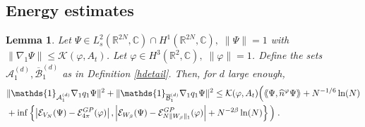 \documentclass[11pt, english, american]{article}
\newcommand{\laa}{\langle\hspace{-0.08cm}\langle}
\newcommand{\raa}{\rangle\hspace{-0.08cm}\rangle}
\newtheorem{lemma}[theorem]{Lemma}
\renewcommand{\phi}{\varphi}
\begin{document}
\subsection{Energy estimates}

\begin{lemma} \label{energylemma}
Let  $\Psi \in L^2_s( \mathbb{R}^{2N}, \mathbb{C})  \cap H^1( \mathbb{R}^{2N}, \mathbb{C}) ,\; \| \Psi \|=1$ with $ \|\nabla_1\Psi  \| \leq \mathcal{K}(\phi, A_t)$. Let 
$ \phi \in H^3(\mathbb{R}^2,\mathbb{C}) , \; \| \phi \|=1$. Define the sets
$ \mathcal{A}^{(d)}_{1},\overline{\mathcal{B}}^{(d)}_{1} $ as in Definition \ref{hdetail}.
Then, for $d$ large enough,
\begin{align*}
&\|\mathds{1}_{\mathcal{A}^{(d)}_{1}}\nabla_1q_1
\Psi \|^2 
+
\|\mathds{1}_{\overline{\mathcal{B}}^{(d)}_{1}}\nabla_1q_1
\Psi \|^2
\leq 
\mathcal{K}(\phi, A_t)
  \Big( \laa\Psi,\widehat{n}^{\phi}\Psi\raa+N^{-1/6} \ln(N)
\\
&+
\inf \left\lbrace 
\left|\mathcal{E}_{V_N}(\Psi)-\mathcal{E}_{4 \pi}^{GP}(\phi)\right|,
\left|\mathcal{E}_{W_\beta}(\Psi)-\mathcal{E}_{N \|W_\beta\|_1}^{GP}(\phi)\right|+ N^{-2 \beta} \ln(N)
\right\rbrace
\Big)
\;.
 \end{align*}
\end{lemma}
\end{document}
